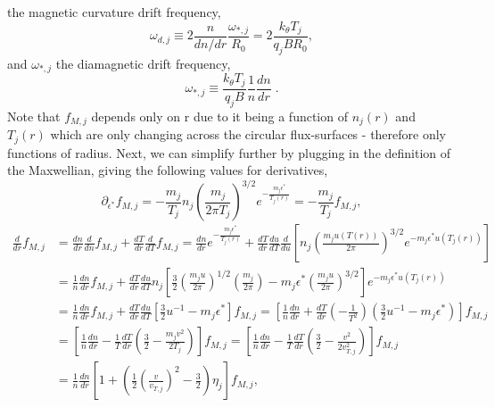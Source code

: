 \documentclass[12pt]{article}
\numberwithin{equation}{subsection}
\begin{document}
the magnetic curvature drift frequency,
   \begin{equation}
      \omega_{d,j} \equiv 2\frac{n}{dn/dr}\frac{\omega_{*,j}}{R_0} = 2\frac{k_\theta T_j}{q_j B R_0},
   \end{equation}
and $\omega_{*,j}$ the diamagnetic drift frequency,
   \begin{equation}
      \omega_{*,j} \equiv \frac{k_\theta T_j}{q_j B}\frac{1}{n}\frac{dn}{dr}\;.
   \end{equation}
Note that $f_{M,j}$ depends only on r due to it being a function of $n_j(r)$ and $T_j(r)$ which are only changing across the circular
flux-surfaces - therefore only functions of radius. Next, we can simplify further by plugging in the definition of the Maxwellian,
giving the following values for derivatives,
   \begin{equation}
      \partial_{\epsilon^*}f_{M,j} = -\frac{m_j}{T_j}n_j\left(\frac{m_j}{2\pi T_j}\right)^{3/2}e^{-\frac{m_j \epsilon^*}{T_j(r)}} =
                                 -\frac{m_j}{T_j}f_{M,j},
   \end{equation}
   \begin{equation}
   \begin{aligned}
      \frac{d}{dr}f_{M,j} &= \frac{dn}{dr}\frac{d}{dn}f_{M,j} + \frac{dT}{dr}\frac{d}{dT}f_{M,j} = 
                         \frac{dn}{dr}e^{-\frac{m_j \epsilon^*}{T_j(r)}} + 
                         \frac{dT}{dr}\frac{du}{dT}\frac{d}{du}[n_j\left(\frac{m_j u(T(r))}{2\pi}\right)^{3/2}e^{-m_j \epsilon^* u(T_j(r))}] \\
                      &= \frac{1}{n}\frac{dn}{dr}f_{M,j} + \frac{dT}{dr}\frac{du}{dT}n_j[\frac{3}{2}\left(\frac{m_ju}{2\pi}\right)^{1/2}
                         \left(\frac{m_j}{2\pi}\right) - m_j\epsilon^*\left(\frac{m_ju}{2\pi}\right)^{3/2}]e^{-m_j \epsilon^* u(T_j(r))} \\
                      &= \frac{1}{n}\frac{dn}{dr}f_{M,j} + \frac{dT}{dr}\frac{du}{dT}[\frac{3}{2}u^{-1} - m_j\epsilon^*]f_{M,j}
                       = [\frac{1}{n}\frac{dn}{dr} + \frac{dT}{dr}(-\frac{1}{T^2})(\frac{3}{2}u^{-1} - m_j\epsilon^*)]f_{M,j} \\
                      &= [\frac{1}{n}\frac{dn}{dr} - \frac{1}{T}\frac{dT}{dr}(\frac{3}{2} - \frac{m_jv^2}{2T_j})]f_{M,j}
                       = [\frac{1}{n}\frac{dn}{dr} - \frac{1}{T}\frac{dT}{dr}(\frac{3}{2} - \frac{v^2}{2v_{T,j}^2})]f_{M,j} \\
                      &= \frac{1}{n}\frac{dn}{dr}[1 + (\frac{1}{2}\left(\frac{v}{v_{T,j}}\right)^2 - \frac{3}{2})\eta_j]f_{M,j},
   \end{aligned}
   \end{equation}
\end{document}

